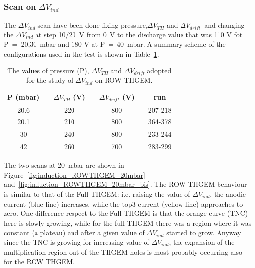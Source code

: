 \documentclass[a4paper, 11 pt]{report}
\newcommand{\Vind}{$\Delta V_{ind}$}
\newcommand{\Vthgem}{$\Delta V_{TH}$}
\newcommand{\Vdrift}{$ \Delta V_{drift}$}
\begin{document}
\subsubsection{Scan on \Vind}
The \Vind{} scan have been done fixing pressure,\Vthgem{} and \Vdrift{}\ and changing the \Vind{} 
at step 10/20~V from 0~V to the discharge value  that was 110 V fot  P~=~20,30~mbar and 180 V at 
P~=~40~mbar.
A summary scheme of the configurations used in the test is shown in Table~\ref{tab:ROWTHGEM_vind}.
\begin{table} [htbp]
	\begin{center}
		\renewcommand{\arraystretch}{1.2}
		\begin{tabular} {ccccccc}
			P (mbar) & & \Vthgem{} (V) & & \Vdrift{} (V) & & run\\
			\toprule[0.1em]
			20.6	& &	220	& &	800 & & 207-218 \\
			20.1	& & 210	& & 800 & & 364-378\\
			30	& &	240	& &	800 & & 233-244\\
			42	& &	260	& &	700 & & 283-299\\		
			\bottomrule[0.1em]
		\end{tabular}
	\end{center}
	\caption{The values of pressure (P), \Vthgem{} and \Vdrift{} adopted for the study of \Vind
	on ROW THGEM.} 
	\label{tab:ROWTHGEM_vind}
\end{table}
The two scans at 20~mbar are shown in Figure~\ref{fig:induction_ROWTHGEM_20mbar} 
and~\ref{fig:induction_ROWTHGEM_20mbar_bis}. The ROW THGEM behaviour is similar to that of the Full 
THGEM: i.e. raising the value of \Vind{}, the anodic current (blue line) increases, while the top3 
current (yellow line) approaches to zero. One difference respect to the Full THGEM is that the 
orange curve (TNC) here is slowly growing, while for the full THGEM there was a region where it was constant (a plateau) and after a given value of \Vind{} started to grow. Anyway since the TNC is 
growing for increasing value of \Vind, the expansion of the multiplication region out of the THGEM 
holes is most probably occurring also for the ROW THGEM.
\end{document}
